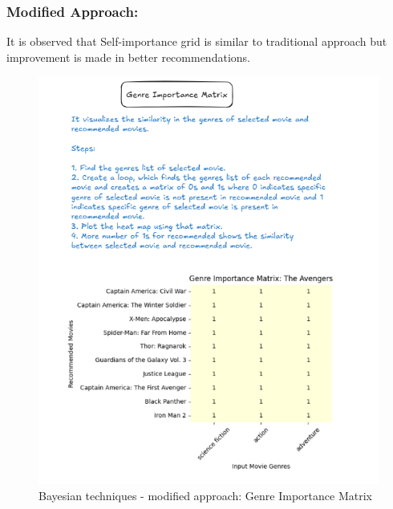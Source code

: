 \documentclass[a4paper]{article}
\theoremstyle{plain}
\begin{document}
\subsubsection{Modified Approach:}
It is observed that Self-importance grid is similar to traditional approach but improvement is made in better recommendations.
\begin{figure}
    \centering
    \includegraphics[width=1\linewidth]{baymod1.png}
    \caption{Bayesian techniques - modified approach: Genre Importance Matrix}
    \label{fig:enter-label}
\end{figure}
\newpage
\end{document}
